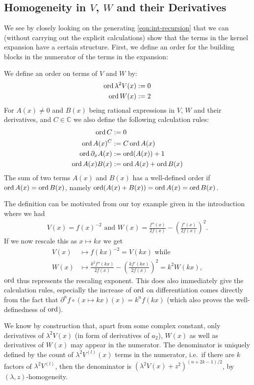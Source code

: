 \subsection{Homogeneity in $V$, $W$ and their Derivatives}
We see by closely looking on the generating \cref{eqn:int-recursion} that we can
(without carrying out the explicit calculations) show that the terms in the
kernel expansion have a certain structure.  First, we define an order for the
building blocks in the numerator of the terms in the expansion:
\begin{Definition}
  \label{def:order}
  We define an order on terms of $V$ and $W$ by:
  \begin{align*}
    \operatorname{ord} \lambda^2 V(x) &:= 0 \\
              \operatorname{ord} W(x) &:= 2
  \end{align*}
  For $A(x)\neq 0$ and $B(x)$ being rational expressions in $V$, $W$ and their
  derivatives, and $C\in\mathbb{C}$ we also define the following calculation
  rules:
  \begin{align*}
    \operatorname{ord} C &:= 0 \\
    \operatorname{ord} A(x)^{C} &:= C\operatorname{ord} A(x) \\
    \operatorname{ord} \partial_x A(x) &:= \operatorname{ord}(A(x)) + 1 \\
    \operatorname{ord} A(x)B(x) &:= \operatorname{ord} A(x) + \operatorname{ord} B(x)
  \end{align*}
  The sum of two terms $A(x)$ and $B(x)$ has a well-defined order if $\operatorname{ord} A(x)
  = \operatorname{ord} B(x)$, namely $\operatorname{ord}(A(x) + B(x)) = \operatorname{ord} A(x) = \operatorname{ord} B(x)$.
  \begin{Remark}
    The definition can be motivated from our toy example given in the
    introduction where we had
    \begin{align*}
      V(x) = f(x)^{-2} \text{ and } W(x) = \frac{f''(x)}{2f(x)} -
      \left(\frac{f'(x)}{2f(x)}\right)^2.
    \end{align*}
    If we now rescale this as $x\mapsto kx$ we get
    \begin{align*}
      V(x) &\mapsto f(kx)^{-2} = V(kx) \text{ while} \\
      W(x) &\mapsto \frac{k^2 f''(kx)}{2f(x)} -
      \left(\frac{kf'(kx)}{2f(x)}\right)^2 = k^2 W(kx),
    \end{align*}
    $\operatorname{ord}$ thus represents the rescaling exponent. This does also immediately
    give the calculation rules, especially the increase of $\operatorname{ord}$ on
    differentiation comes directly from the fact that $\partial^n
    f\circ(x\mapsto kx)(x) = k^n f(kx)$ (which also proves the well-definedness
    of $\operatorname{ord}$).
  \end{Remark}
\end{Definition}
We know by construction that, apart from some complex constant, only derivatives
of $\lambda^2 V(x)$ (in form of derivatives of $a_2$), $W(x)$ as well as
derivatives of $W(x)$ may appear in the numerator. The denominator is uniquely
defined by the count of $\lambda^2 V^{(l)}(x)$ terms in the numerator, i.e.\ if
there are $k$ factors of $\lambda^2 V^{(l)}$, then the denominator is
$(\lambda^2 V(x) + z^2)^{(n+2k-1)/2}$, by $(\lambda,z)$-homogeneity.

